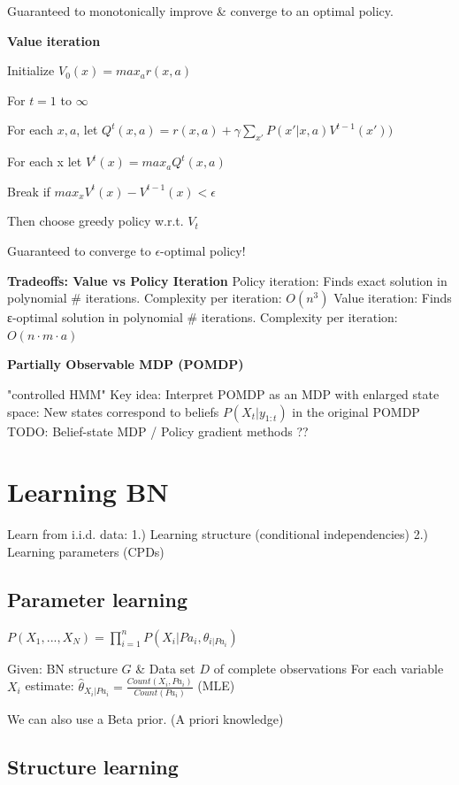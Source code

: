 \documentclass[a4paper, 11pt, landscape]{article}
\begin{document}
\begin{multicols*}{3}
Guaranteed to monotonically improve \& converge to an optimal policy.

\textbf{Value iteration}
\begin{compactitem}
\item Initialize $V_0(x) = max_a r(x, a)$
\item For $t=1$ to $\infty$ 
\item For each $x, a$, let $Q^t(x,a) = r(x, a) + \gamma \sum_{x'} P(x' | x, a) V^{t-1}(x'))$
\item For each x let $V^t(x) = max_a Q^t(x,a)$
\item Break if $max_x V^t(x) - V^{t-1}(x) < \epsilon$
\item Then choose greedy policy w.r.t. $V_t$
\end{compactitem}

Guaranteed to converge to $\epsilon$-optimal policy!

\textbf{Tradeoffs: Value vs Policy Iteration}
Policy iteration: Finds exact solution in polynomial \# iterations. Complexity per iteration: $O(n^3)$
Value iteration: Finds ε-optimal solution in polynomial \# iterations. Complexity per iteration: $O(n\cdot m \cdot a)$

\textbf{Partially Observable MDP (POMDP)}

"controlled HMM"
Key idea: Interpret POMDP as an MDP with enlarged state space: New states correspond to beliefs $P(X_t | y_{1:t})$ in the original POMDP
TODO: Belief-state MDP / Policy gradient methods ??

\section{Learning BN}
Learn from i.i.d. data: 1.) Learning structure (conditional independencies) 2.) Learning parameters (CPDs)

\subsection{Parameter learning} 

$P(X_1, ..., X_N) = \prod_{i=1}^{n} P(X_i | Pa_i, {\theta}_{i | Pa_i})$

Given:  BN structure $G$ \& Data set $D$ of complete observations
For each variable $X_i$ estimate: $\hat{\theta}_{X_i | Pa_i} = \frac{Count(X_i , Pa_i)}{Count(Pa_i)}$ (MLE)

We can also use a Beta prior. (A priori knowledge)

\subsection{Structure learning}


\end{multicols*}
\end{document}
